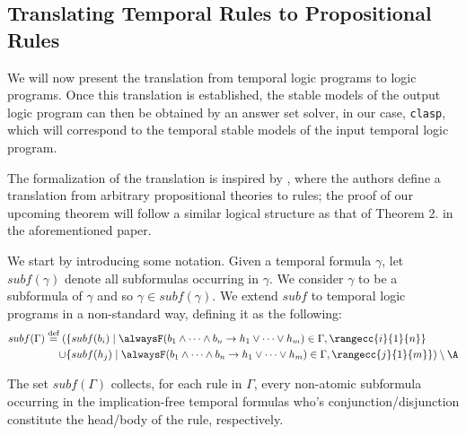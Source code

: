 \subsection{Translating Temporal Rules to Propositional Rules}

We will now present the translation from temporal logic programs to
logic programs. Once this translation is established, the stable
models of the output logic program can then be obtained by an answer
set solver, in our case, \verb|clasp|, which will correspond to the
temporal stable models of the input temporal logic program.

The formalization of the translation is inspired by
\cite[p. 9]{capeva05a}, where the authors define a translation from
arbitrary propositional theories to rules; the proof of our upcoming
theorem will follow a similar logical structure as that of Theorem
2. in the aforementioned paper.

We start by introducing some notation.  Given a temporal formula
$\gamma$, let $subf(\gamma)$ denote all subformulas occurring in
$\gamma$. We consider $\gamma$ to be a subformula of $\gamma$ and so
$\gamma \in subf(\gamma)$. We extend $subf$ to temporal logic programs
in a non-standard way, defining it as the following:
\begin{align*}
subf(\Gamma) \defeq (&\{ subf(b_i) \mid \temprulelong \in \Gamma, \rangecc{i}{1}{n} \}\\
  \cup &\{ subf(h_j) \mid \temprulelong \in \Gamma,\rangecc{j}{1}{m} \})\setminus \A
\end{align*}

The set $subf(\Gamma)$ collects, for each rule in $\Gamma$, every
non-atomic subformula occurring in the implication-free temporal
formulas who's conjunction/disjunction constitute the head/body of the
rule, respectively.

